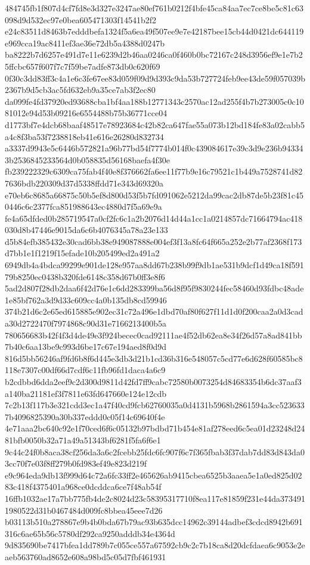 \documentclass[11pt,a4paper]{article}
\begin{document}
{484745fb1f807d4cf7fd8e3d327e3247ae80ef761b0212f4bfe45ca84aa7ec7ce8be5c81c63098d9d532ec97e0bea605471303f14541b2f2
e24c83511d8463b7edddbefa1324f5a6ea49f507ee9e7e42187bee15cb44d0421dc644119e969cca19ac8411ef3ae36e72db5a4388d0247b
ba8222b7d6257e491d7e11e6239d2b46aa0246ca0f460b0bc72167c248d3956ef9e1e7b25ffcbc657f607f7c7f59be7adfe873db0c620f69
0f30c3dd83ff3c4a1e6c3fe67ee83d059f09d9d393c9da53b727724feb9ee43de59f057039b2367b9d5cb3ac5fd632eb9a35ce7ab3f2ec80
da099fe4fd37920ed93688cba1bf4aa188b12771343c2570ac12ad255f4b7b273005c0c1081012e94d53b09216e6554488b75b36771cce04
d1773bf7e4dcb68baaf48517e78923684c42b82ca647fae55a073b12bd184fe83a02cabb5a4c8f3ba53f7238818eb41e616e26280d832734
a3337d9943e5c6446b572821a96b77bd54f7774b014f0c439084617e39c3d9e236b943343b2536845233564d0b058835d56168baefa4f30e
fb239222329c6309ca75fab4f40e8f376662fa6ee11f77b9e16c79521c1b449a7528741d827636bdb220309d37d5338ffdd71e343d69320a
e70eb6c8685a66875c50b5ef8d800d53f5b7fd091062e5212da99cac2db87de5b23f81c450446c6c2377fca851988643ec4880d7f5a69e9a
fe4a65dfded0b285719547a0cf2fc6c1a2b2076d14d44a1cc1a0214857dc71664794ac418030d8b47446e9015da6c6b4076345a78a23e133
d5b84efb385432e30cad6bb38e949087888e004ef3f13a8fc64f665a252e2b77af2368f173d7bb1e1f1219f15efade10b205499ed2a491a2
6949db4a4bdca99299e901de128e957aa8dd67b238b99f9db1ae531b9dcf1d49ca18f59179b8250ec0438b320fde6148c358d67b0ff3e8f6
5ad2d807f28db2daa6f42d76e1c6dd283399ba56d8f95f9830244fec58460d93fdbc48ade1e85bf762a3d9d33c609cc4a0b135db8cd59946
374b21d6c2e65ed615885e902ec31c72a496e1dbd70af80f627f11d1d0f200caa2a0d3cada30d2722470f7974868c90d31e7166213400b5a
780656683b42f4f3d4de49e3f924becec0cad92111ae4f52db62ea8e34f26d57a8ad841bb7b40c6aa13be9c993d6be17c67e194aed8f0d9d
816d5bb56246af9fd6b8f6d445e3db3d21b1cd36b316e548057c5cd77e6d628f60585bc8118e7307c00df66d7cdf6c11fb96fd1daca4a6c9
b2cdbbd6dda2eef9c2d300d9811d42fd7ff9cabc72580b0073254d84683354b6dc37aaf3a140ba21181ef3f7811e63fd647660e124e12cdb
7c2b13f117b3e321cdd3ec1a47f40cd9fcb62760035a0d4131b5968b2861594a3cc5236337b4096825390a30b337eddd0c05f14c69640f4e
4e71aaa2bc640c92e1f70ced6f6c05132b97bdbd71b454e81af278eed6c5ea01d23248d2481bfb0050b32a71a49a51343bf6281f5fa6f6e1
9c44c24f0b8aca38cf256da3a6c2fcebb25fdc6fc907f6c7f365fbab3f37dab7dd83d843da03cc70f7e03f8ff279b0fd983ef49e823d219f
e9c964eda9db13f999d64c72a6fc33ff2e465626ab9415cbea6525b3aaea5e1a0ed825d0283c418f4375401a968ce0dcddca6ce7f48ab54f
16ffb1032ae17a7bb775fb4de2c8024d23c58395317710f8ea117e81859f231e44da3734911980522d31b0467484d009fc8bbea45eee7d26
b03113b510a278867e9b4b0bda67b79ac93b635dcc14962c39144adbef3cdcd8942b691316c6ae65b56c5780df292ca9250adddb34e4364d
9d835690be7417bfea1dd789b7c055ce557a67592cb9c2c7b18ca8d20dcfdaea6c9053e2eaeb563760ad8652e608a98bd5c05d7fbf461931
}
\end{document}
